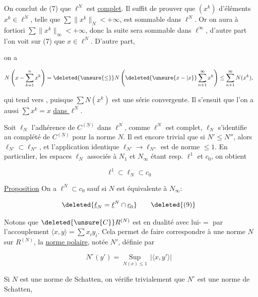 
On conclut de (7) que $\ell^N$ est \uline{complet}. Il suffit de prouver que  $(x^k)$  d'éléments $x^k\in\ell^N$, telle que $\sum\lVert x^{k}\rVert_N<+\infty$, est sommable dans $\ell^N$. Or  on aura à fortiori $\sum\lVert x^k\rVert_\infty<+\infty$, donc la  suite sera sommable dans $\ell^\infty$,  d'autre part l'on  voit sur (7) que $x\in\ell^N$. D'autre part,


on a

\[
N\left(x-\sum_{k=1}^n x^k\right)=\deleted{\unsure{\leq}}N\left(\deleted{\unsure{x-|x}}\sum_{n+1}^\infty x^k\right)\leq\sum_{n+1}^{\infty}N(x^k),
\]

qui tend vers , puisque $\sum N(x^k)$ est une série convergente. Il s'ensuit que l'on a aussi $\sum x^k=x$ \uline{dans $\ell^N$}.

Soit $\ell_N$ l'adhérence de $C^{(\underline N)}$ dans $\ell^N$, comme $\ell^N$ est complet, $\ell_N$ s'identifie au complété de $C^{(\underline N)}$ pour la norme $N$. Il est encore trivial que si $N'\leq N''$, alors $\ell_{N'}\subset\ell_{N''}$, et l'application identique $\ell_{N'}\to\ell_{N''}$ est de norme $\leq 1$. En particulier, les espaces $\ell_N$ associés à $N_1$ et $N_\infty$ étant resp. $\ell^1$ et $c_0$, on obtient

\[
\ell^1\subset\ell_N\subset c_0\tag*{(8)}
\]

\uline{Proposition} On a $\ell^N\subset c_0$ sauf si $N$ est équivalente à $N_\infty$:


\[
\deleted{\underline{\ell}_N=\underline{\ell}^N\cap\underline{c}_0}\tag*{\deleted{(9)}}
\]


Notons que $\deleted{\unsure{C}}R^{(N)}$ est en dualité avec lui-$=$ par l'accouplement $\langle x,y\rangle=\sum x_i y_i$. Cela permet de faire correspondre à  une norme $N$ sur $R^{(N)}$, la \uline{norme polaire}, notée $N'$, définie par

\[
N^\circ(y')=\underset{N(x)\leq 1}{\operatorname{Sup}}\,|\langle x,y'\rangle|\tag*{(9)}
\]


Si $N$ est une norme de Schatten, on vérifie trivialement que $N^\circ$ est une norme de Schatten,    
